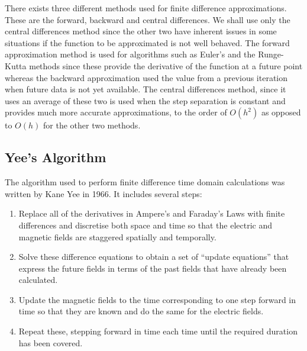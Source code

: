 There exists three different methods used for finite difference approximations. These are the forward, backward and central differences. We shall use only the central differences method since the other two have inherent issues in some situations if the function to be approximated is not well behaved. The forward approximation method is used for algorithms such as Euler's and the Runge-Kutta methods since these provide the derivative of the function at a future point whereas the backward approximation used the value from a previous iteration when future data is not yet available. The central differences method, since it uses an average of these two is used when the step separation is constant and provides much more accurate approximations, to the order of $O(h^2)$ as opposed to $O(h)$ for the other two methods. 

\subsection{Yee's Algorithm} %
\label{sub:yee_s_algorithm}
The algorithm used to perform finite difference time domain calculations was written by Kane Yee in 1966. It includes several steps:
\begin{enumerate}
	\item Replace all of the derivatives in Ampere's and Faraday's Laws with finite differences and discretise both space and time so that the electric and magnetic fields are staggered spatially and temporally.
	\item Solve these difference equations to obtain a set of ``update equations'' that express the future fields in terms of the past fields that have already been calculated.
	\item Update the magnetic fields to the time corresponding to one step forward in time so that they are known and do the same for the electric fields.
	\item Repeat these, stepping forward in time each time until the required duration has been covered.
\end{enumerate}

